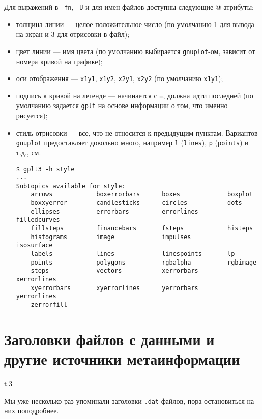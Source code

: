 \documentclass[12pt]{article}
\def\gplt{{\tt gplt}}
\def\gnuplot{{\tt gnuplot}}
\begin{document}
Для выражений в \verb'-fn', \verb'-U' и для имен файлов доступны следующие @-атрибуты:
\begin{itemize}
\item толщина линии --- целое положительное число (по умолчанию 1 для вывода на экран и 3 для отрисовки в файл);
\item цвет линии --- имя цвета (по умолчанию выбирается \gnuplot-ом, зависит от номера кривой на графике);
\item оси отображения --- \verb'x1y1', \verb'x1y2', \verb'x2y1', \verb'x2y2' (по умолчанию \verb'x1y1');
\item подпись к кривой на легенде --- начинается с \verb'=', должна идти последней (по умолчанию задается \gplt{} на основе информации о том, что именно рисуется);
\item стиль отрисовки --- все, что не относится к предыдущим пунктам. Вариантов \gnuplot{} предоставляет довольно много, например \verb'l' (\verb'lines'),
  \verb'p' (\verb'points') и т.д., см.
\begin{verbatim}
$ gplt3 -h style
...
Subtopics available for style:
    arrows            boxerrorbars      boxes             boxplot
    boxxyerror        candlesticks      circles           dots
    ellipses          errorbars         errorlines        filledcurves
    fillsteps         financebars       fsteps            histeps
    histograms        image             impulses          isosurface
    labels            lines             linespoints       lp
    points            polygons          rgbalpha          rgbimage
    steps             vectors           xerrorbars        xerrorlines
    xyerrorbars       xyerrorlines      yerrorbars        yerrorlines
    zerrorfill
\end{verbatim}
\end{itemize}

\section{Заголовки файлов с данными и другие источники метаинформации}
\begin{wrapfigure}[5]{t}{.3\textwidth}
  \vphantom{.}
  \vspace{-1.2cm}

\end{wrapfigure}
Мы уже несколько раз упоминали заголовки \verb'.dat'-файлов, пора остановиться на них поподробнее.
\end{document}
